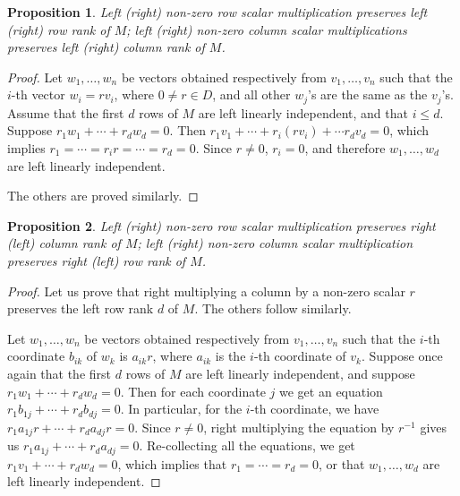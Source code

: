 \documentclass[12pt]{article}
\newtheorem{prop}{Proposition}
\begin{document}
\begin{prop} Left (right) non-zero row scalar multiplication preserves left (right) row rank of $M$; left (right) non-zero column scalar multiplications preserves left (right) column rank of $M$.  \end{prop}
\begin{proof}  Let $w_1,\ldots, w_n$ be vectors obtained respectively from $v_1,\ldots, v_n$ such that the $i$-th vector $w_i=rv_i$, where $0\ne r\in D$, and all other $w_j$'s are the same as the $v_j$'s.  Assume that the first $d$ rows of $M$ are left linearly independent, and that $i\le d$.  Suppose $r_1w_1+\cdots + r_dw_d=0$.  Then $r_1v_1+ \cdots + r_i(rv_i) + \cdots r_dv_d = 0$, which implies $r_1 = \cdots = r_ir = \cdots = r_d = 0$.  Since $r\ne 0$, $r_i=0$, and therefore $w_1,\ldots, w_d$ are left linearly independent.

The others are proved similarly.
\end{proof}

\begin{prop} Left (right) non-zero row scalar multiplication preserves right (left) column rank of $M$; left (right) non-zero column scalar multiplication preserves right (left) row rank of $M$. \end{prop}
\begin{proof}
Let us prove that right multiplying a column by a non-zero scalar $r$ preserves the left row rank $d$ of $M$.  The others follow similarly.

Let $w_1,\ldots, w_n$ be vectors obtained respectively from $v_1,\ldots, v_n$ such that the $i$-th coordinate $b_{ik}$ of $w_k$ is $a_{ik}r$, where $a_{ik}$ is the $i$-th coordinate of $v_k$.  Suppose once again that the first $d$ rows of $M$ are left linearly independent, and suppose $r_1w_1 + \cdots + r_dw_d=0$.  Then for each coordinate $j$ we get an equation $r_1b_{1j}+\cdots + r_d b_{dj}=0$.  In particular, for the $i$-th coordinate, we have $r_1a_{1j}r+\cdots + r_d a_{dj}r=0$.  Since $r\ne 0$, right multiplying the equation by $r^{-1}$ gives us $r_1a_{1j}+\cdots + r_d a_{dj}=0$.  Re-collecting all the equations, we get $r_1v_1+\cdots +r_dw_d=0$, which implies that $r_1= \cdots = r_d = 0$, or that $w_1,\ldots, w_d$ are left linearly independent.
\end{proof}

\end{document}
